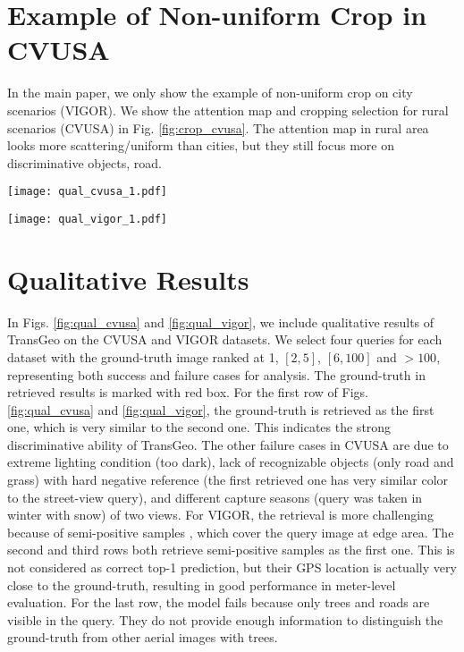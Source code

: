 \documentclass[10pt,twocolumn,letterpaper]{article}
\begin{document}
\section{Example of Non-uniform Crop in CVUSA}
In the main paper, we only show the example of non-uniform crop on city scenarios (VIGOR). We show the attention map and cropping selection for rural scenarios (CVUSA) in Fig. \ref{fig:crop_cvusa}. The attention map in rural area looks more scattering/uniform than cities, but they still focus more on discriminative objects, \eg road.

\begin{figure*}[!htbp]
    \centering
    \texttt{[image: qual\_cvusa\_1.pdf]}
    \caption{Qualitative results on CVUSA. Red box indicates ground-truth in retrieved results. The ground-truth is ranked at $1,2,6,148$ for four queries respectively.}
    \label{fig:qual_cvusa}
\end{figure*}

\begin{figure*}[!htbp]
    \centering
    \texttt{[image: qual\_vigor\_1.pdf]}
    \caption{Qualitative results on VIGOR. Red box indicates ground-truth in retrieved results. The ground-truth is ranked at $1,2,9,165$ for four queries respectively.}
    \label{fig:qual_vigor}
\end{figure*}
\section{Qualitative Results}
\label{sec:qualitative}


In Figs. \ref{fig:qual_cvusa} and \ref{fig:qual_vigor}, we include qualitative results of TransGeo on the CVUSA and VIGOR datasets. We select four queries for each dataset with the ground-truth image ranked at 1, $[2,5]$, $[6,100]$ and $>100$, representing both success and failure cases for analysis. The ground-truth in retrieved results is marked with red box. For the first row of Figs. \ref{fig:qual_cvusa} and \ref{fig:qual_vigor}, the ground-truth is retrieved as the first one, which is very similar to the second one. This indicates the strong discriminative ability of TransGeo. The other failure cases in CVUSA are due to extreme lighting condition (too dark), lack of recognizable objects (only road and grass) with hard negative reference (the first retrieved one has very similar color to the street-view query), and different capture seasons (query was taken in winter with snow) of two views. For VIGOR, the retrieval is more challenging because of semi-positive samples \cite{zhu2021vigor}, which cover the query image at edge area. The second and third rows both retrieve semi-positive samples as the first one. This is not considered as correct top-1 prediction, but their GPS location is actually very close to the ground-truth, resulting in good performance in meter-level evaluation. For the last row, the model fails because only trees and roads are visible in the query. They do not provide enough information to distinguish the ground-truth from other aerial images with trees.
\end{document}

